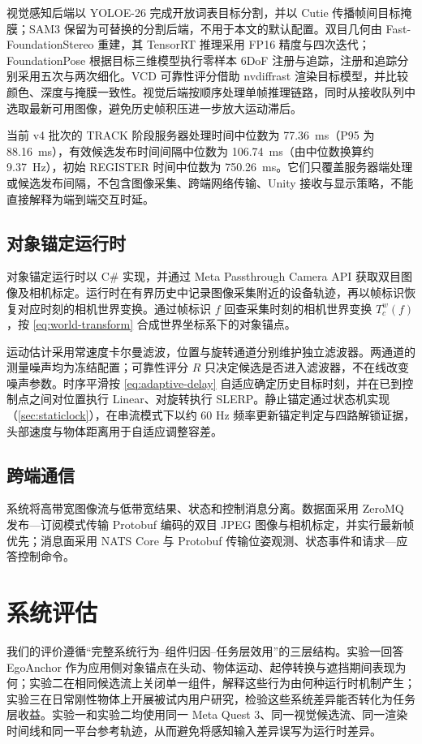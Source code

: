 \documentclass[review]{vgtc}
\begin{document}
视觉感知后端以 YOLOE-26 完成开放词表目标分割，并以 Cutie 传播帧间目标掩膜；SAM3 保留为可替换的分割后端，不用于本文的默认配置。双目几何由 Fast-FoundationStereo 重建，其 TensorRT 推理采用 FP16 精度与四次迭代；FoundationPose 根据目标三维模型执行零样本 6DoF 注册与追踪，注册和追踪分别采用五次与两次细化。VCD 可靠性评分借助 nvdiffrast 渲染目标模型，并比较颜色、深度与掩膜一致性。视觉后端按顺序处理单帧推理链路，同时从接收队列中选取最新可用图像，避免历史帧积压进一步放大运动滞后。

当前 v4 批次的 TRACK 阶段服务器处理时间中位数为 77.36~ms（P95 为 88.16~ms），有效候选发布时间间隔中位数为 106.74~ms（由中位数换算约 9.37~Hz），初始 REGISTER 时间中位数为 750.26~ms。它们只覆盖服务器端处理或候选发布间隔，不包含图像采集、跨端网络传输、Unity 接收与显示策略，不能直接解释为端到端交互时延。

\subsection{对象锚定运行时}


对象锚定运行时以 C\# 实现，并通过 Meta Passthrough Camera API 获取双目图像及相机标定。运行时在有界历史中记录图像采集附近的设备轨迹，再以帧标识恢复对应时刻的相机世界变换。通过帧标识 $f$ 回查采集时刻的相机世界变换 $T_c^w (f)$，按 \ref{eq:world-transform} 合成世界坐标系下的对象锚点。

运动估计采用常速度卡尔曼滤波，位置与旋转通道分别维护独立滤波器。两通道的测量噪声均为冻结配置；可靠性评分 $R$ 只决定候选是否进入滤波器，不在线改变噪声参数。时序平滑按 \ref{eq:adaptive-delay} 自适应确定历史目标时刻，并在已到控制点之间对位置执行 Linear、对旋转执行 SLERP。静止锚定通过状态机实现（\ref{sec:staticlock}），在串流模式下以约 60 Hz 频率更新锚定判定与四路解锁证据，头部速度与物体距离用于自适应调整容差。

\subsection{跨端通信}


系统将高带宽图像流与低带宽结果、状态和控制消息分离。数据面采用 ZeroMQ 发布---订阅模式传输 Protobuf 编码的双目 JPEG 图像与相机标定，并实行最新帧优先；消息面采用 NATS Core 与 Protobuf 传输位姿观测、状态事件和请求---应答控制命令。

\section{系统评估}\label{sec:eval}

我们的评价遵循“完整系统行为--组件归因--任务层效用”的三层结构。实验一回答 EgoAnchor 作为应用侧对象锚点在头动、物体运动、起停转换与遮挡期间表现为何；实验二在相同候选流上关闭单一组件，解释这些行为由何种运行时机制产生；实验三在日常刚性物体上开展被试内用户研究，检验这些系统差异能否转化为任务层收益。实验一和实验二均使用同一 Meta Quest 3、同一视觉候选流、同一渲染时间线和同一平台参考轨迹，从而避免将感知输入差异误写为运行时差异。
\end{document}
